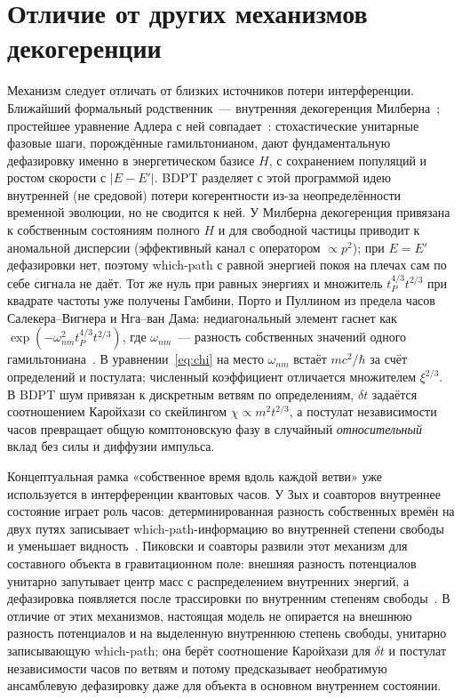\documentclass[12pt,a4paper]{article}
\begin{document}
\section{Отличие от других механизмов декогеренции}
\label{sec:other_mechanisms}
Механизм следует отличать от близких источников потери интерференции. Ближайший формальный родственник~--- внутренняя декогеренция Милберна~\cite{milburn1991}; простейшее уравнение Адлера с ней совпадает~\cite{adler2004,diosi2005}: стохастические унитарные фазовые шаги, порождённые гамильтонианом, дают фундаментальную дефазировку именно в энергетическом базисе $H$, с сохранением популяций и ростом скорости с $|E-E'|$. BDPT разделяет с этой программой идею внутренней (не средовой) потери когерентности из-за неопределённости временной эволюции, но не сводится к ней. У Милберна декогеренция привязана к собственным состояниям полного $H$ и для свободной частицы приводит к аномальной дисперсии (эффективный канал с оператором $\propto p^2$); при $E=E'$ дефазировки нет, поэтому which-path с равной энергией покоя на плечах сам по себе сигнала не даёт. Тот же нуль при равных энергиях и множитель \(t_P^{4/3}t^{2/3}\) при квадрате частоты уже получены Гамбини, Порто и Пуллином из предела часов Салекера--Вигнера и Нга--ван Дама: недиагональный элемент гаснет как \(\exp(-\omega_{nm}^2 t_P^{4/3}t^{2/3})\), где \(\omega_{nm}\)~--- разность собственных значений одного гамильтониана~\cite{gambini2004,gambini2007}. В уравнении~\eqref{eq:chi} на место \(\omega_{nm}\) встаёт \(mc^2/\hbar\) за счёт определений и постулата; численный коэффициент отличается множителем \(\xi^{2/3}\). В BDPT шум привязан к дискретным ветвям по определениям, $\delta t$ задаётся соотношением Каройхази со скейлингом $\chi\propto m^2 t^{2/3}$, а постулат независимости часов превращает общую комптоновскую фазу в случайный \emph{относительный} вклад без силы и диффузии импульса. 

Концептуальная рамка «собственное время вдоль каждой ветви» уже используется в интерференции квантовых часов. У Зых и соавторов внутреннее состояние играет роль часов: детерминированная разность собственных времён на двух путях записывает which-path-информацию во внутренней степени свободы и уменьшает видность~\cite{zych2011proper}. Пиковски и соавторы развили этот механизм для составного объекта в гравитационном поле: внешняя разность потенциалов унитарно запутывает центр масс с распределением внутренних энергий, а дефазировка появляется после трассировки по внутренним степеням свободы~\cite{pikovski2015}. В отличие от этих механизмов, настоящая модель не опирается на внешнюю разность потенциалов и на выделенную внутреннюю степень свободы, унитарно записывающую which-path; она берёт соотношение Каройхази для $\delta t$ и постулат независимости часов по ветвям и потому предсказывает необратимую ансамблевую дефазировку даже для объекта в основном внутреннем состоянии.
\end{document}
